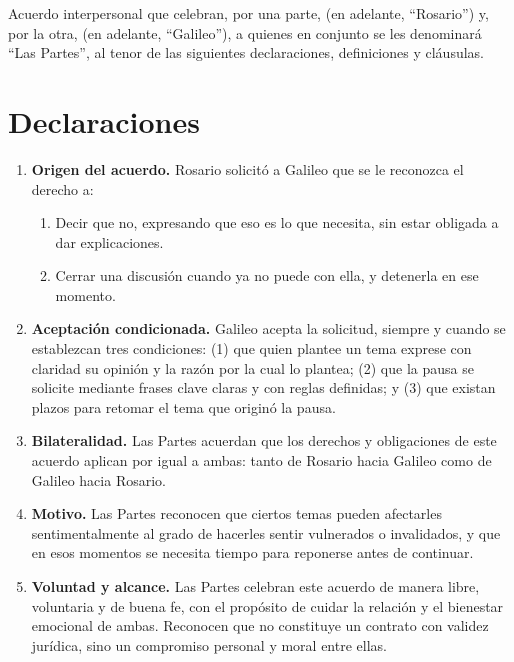 
Acuerdo interpersonal que celebran, por una parte, \textbf{\ParteA} (en adelante, \enquote{Rosario}) y, por la otra, \textbf{\ParteB} (en adelante, \enquote{Galileo}), a quienes en conjunto se les denominará \enquote{Las Partes}, al tenor de las siguientes declaraciones, definiciones y cláusulas.

\section{Declaraciones}

\begin{enumerate}[label=\Roman*., leftmargin=*, itemsep=0.4em]
  \item \textbf{Origen del acuerdo.} Rosario solicitó a Galileo que se le reconozca el derecho a:
  \begin{enumerate}[label=\alph*), itemsep=0.2em]
    \item Decir que no, expresando que eso es lo que necesita, sin estar obligada a dar explicaciones.
    \item Cerrar una discusión cuando ya no puede con ella, y detenerla en ese momento.
  \end{enumerate}

  \item \textbf{Aceptación condicionada.} Galileo acepta la solicitud, siempre y cuando se establezcan tres condiciones: (1) que quien plantee un tema exprese con claridad su opinión y la razón por la cual lo plantea; (2) que la pausa se solicite mediante frases clave claras y con reglas definidas; y (3) que existan plazos para retomar el tema que originó la pausa.

  \item \textbf{Bilateralidad.} Las Partes acuerdan que los derechos y obligaciones de este acuerdo aplican por igual a ambas: tanto de Rosario hacia Galileo como de Galileo hacia Rosario.

  \item \textbf{Motivo.} Las Partes reconocen que ciertos temas pueden afectarles sentimentalmente al grado de hacerles sentir vulnerados o invalidados, y que en esos momentos se necesita tiempo para reponerse antes de continuar.

  \item \textbf{Voluntad y alcance.} Las Partes celebran este acuerdo de manera libre, voluntaria y de buena fe, con el propósito de cuidar la relación y el bienestar emocional de ambas. Reconocen que no constituye un contrato con validez jurídica, sino un compromiso personal y moral entre ellas.
\end{enumerate}

